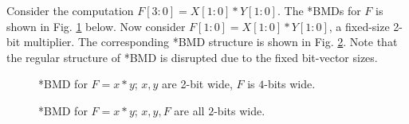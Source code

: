 Consider the computation $F[3:0] = X[1:0] * Y[1:0]$. The *BMDs for $F$
is shown in Fig. \ref{fig:bmd1} below. Now consider $F[1:0] = X[1:0] *
Y[1:0]$, a fixed-size 2-bit multiplier. The corresponding *BMD
structure is shown in Fig. \ref{fig:bmd2}. Note that the regular
structure of *BMD is disrupted due to the fixed bit-vector sizes.



\begin{figure}[htb]
\epsfxsize=4cm
\epsfysize=6cm
\centerline{}
\caption{*BMD for $F = x*y$; $x, y$ are 2-bit wide, $F$ is $4$-bits
  wide.} 
\label{fig:bmd1}
\end{figure}

\begin{figure}[htb]
\epsfxsize=4cm
\epsfysize=6cm
\centerline{}
\caption{*BMD for $F = x*y$; $x, y, F$ are all $2$-bits wide.}
\label{fig:bmd2}
\end{figure}


